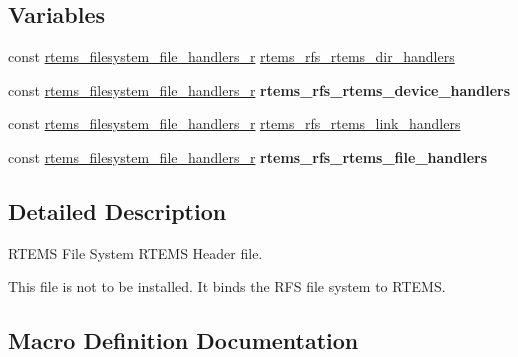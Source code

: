 \subsection*{Variables}
\begin{DoxyCompactItemize}
\item 
const \mbox{\hyperlink{struct__rtems__filesystem__file__handlers__r}{rtems\+\_\+filesystem\+\_\+file\+\_\+handlers\+\_\+r}} \mbox{\hyperlink{rtems-rfs-rtems_8h_add62aab33d39c83e13c93bac9f74a6d2}{rtems\+\_\+rfs\+\_\+rtems\+\_\+dir\+\_\+handlers}}
\item 
\mbox{\label{rtems-rfs-rtems_8h_adc54e78fa9286c187f9389068eb230e0}} 
const \mbox{\hyperlink{struct__rtems__filesystem__file__handlers__r}{rtems\+\_\+filesystem\+\_\+file\+\_\+handlers\+\_\+r}} {\bfseries rtems\+\_\+rfs\+\_\+rtems\+\_\+device\+\_\+handlers}
\item 
const \mbox{\hyperlink{struct__rtems__filesystem__file__handlers__r}{rtems\+\_\+filesystem\+\_\+file\+\_\+handlers\+\_\+r}} \mbox{\hyperlink{rtems-rfs-rtems_8h_a1b1aa463d7b6bd01b968b2d557dd33dd}{rtems\+\_\+rfs\+\_\+rtems\+\_\+link\+\_\+handlers}}
\item 
\mbox{\label{rtems-rfs-rtems_8h_ac411402e0058199f17bf290e6acc2118}} 
const \mbox{\hyperlink{struct__rtems__filesystem__file__handlers__r}{rtems\+\_\+filesystem\+\_\+file\+\_\+handlers\+\_\+r}} {\bfseries rtems\+\_\+rfs\+\_\+rtems\+\_\+file\+\_\+handlers}
\end{DoxyCompactItemize}


\subsection{Detailed Description}
R\+T\+E\+MS File System R\+T\+E\+MS Header file.

This file is not to be installed. It binds the R\+FS file system to R\+T\+E\+MS. 

\subsection{Macro Definition Documentation}
\mbox{\label{rtems-rfs-rtems_8h_a25a16fbddd85208062d7ddbce2731101}} 
